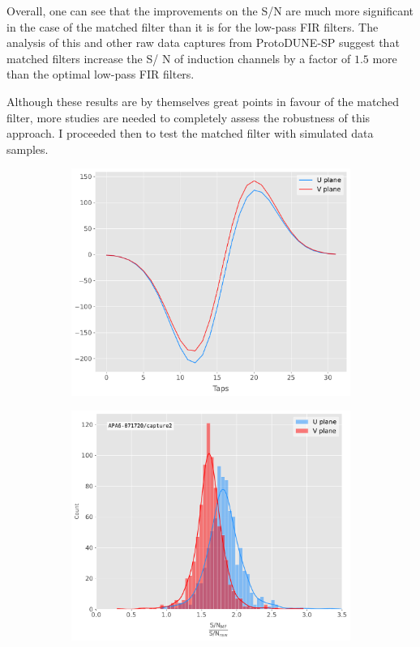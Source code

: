 Overall, one can see that the improvements on the S/N are much more significant in the case of the matched filter than it is for the low-pass FIR filters. The analysis of this and other raw data captures from ProtoDUNE-SP suggest that matched filters increase the S/
N of induction channels by a factor of $1.5$ more than the optimal low-pass FIR filters.

Although these results are by themselves great points in favour of the matched filter, more studies are needed to completely assess the robustness of this approach. I proceeded then to test the matched filter with simulated data samples.

\begin{figure}[t]
	\begin{subfigure}{0.5\textwidth}
		\centering
		\includegraphics[width=.99\linewidth]{Images/Matched_Filter/optimal_coeffs}
	\end{subfigure}
	\begin{subfigure}{0.5\textwidth}
		\centering
		\includegraphics[width=.99\linewidth]{Images/Matched_Filter/improvement_capture}

\end{subfigure}
\end{figure}
